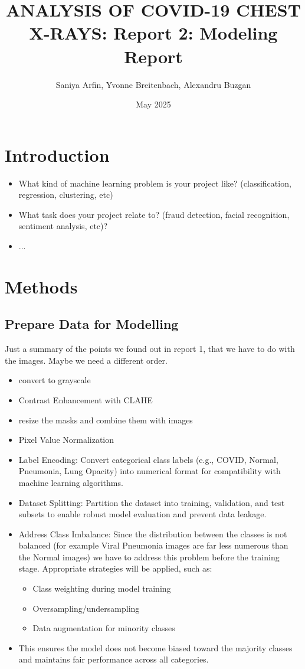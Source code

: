 \documentclass{article}
\title{ANALYSIS OF COVID-19 CHEST X-RAYS: Report 2: Modeling Report}
\author{Saniya Arfin, Yvonne Breitenbach, Alexandru Buzgan}
\date{May 2025}
\begin{document}
\maketitle

\tableofcontents

\newpage 

\section{Introduction}
\begin{itemize}
    \item What kind of machine learning problem is your project like? (classification, regression, clustering, etc)
    \item What task does your project relate to? (fraud detection, facial recognition, sentiment analysis, etc)?
    \item ...
\end{itemize}

\section{Methods}

\subsection{Prepare Data for Modelling}
Just a summary of the points we found out in report 1, that we have to do with the images. Maybe we need a different order.
\begin{itemize}
    \item convert to grayscale
    \item Contrast Enhancement with CLAHE
    \item resize the masks and combine them with images
    \item Pixel Value Normalization
    \item Label Encoding: Convert categorical class labels (e.g., COVID, Normal, Pneumonia, Lung Opacity) into numerical format for compatibility with machine learning algorithms.
    \item Dataset Splitting: Partition the dataset into training, validation, and test subsets to enable robust model evaluation and prevent data leakage.
    \item Address Class Imbalance: Since the distribution between the classes is not balanced (for example Viral Pneumonia images are far less numerous than the Normal images) we have to address this problem before the training stage. Appropriate strategies will be applied, such as:
    \begin{itemize}
        \item Class weighting during model training
        \item Oversampling/undersampling
        \item Data augmentation for minority classes
    \end{itemize}
    \item This ensures the model does not become biased toward the majority classes and maintains fair performance across all categories.
\end{itemize}
\end{document}
